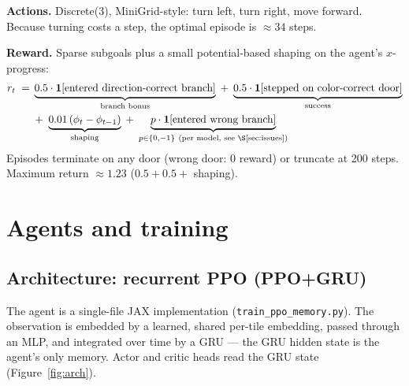 \documentclass[11pt]{article}
\begin{document}
\textbf{Actions.} Discrete(3), MiniGrid-style: turn left, turn right, move forward. Because
turning costs a step, the optimal episode is $\approx 34$ steps.

\textbf{Reward.} Sparse subgoals plus a small potential-based shaping on the agent's
$x$-progress:
\begin{align*}
r_t \;=\;& \underbrace{0.5\cdot\mathbf{1}[\text{entered direction-correct branch}]}_{\text{branch bonus}}
\;+\; \underbrace{0.5\cdot\mathbf{1}[\text{stepped on color-correct door}]}_{\text{success}} \\
&+\; \underbrace{0.01\,(\phi_t - \phi_{t-1})}_{\text{shaping}}
\;+\; \underbrace{p\cdot\mathbf{1}[\text{entered wrong branch}]}_{p \in \{0, -1\}\ \text{(per model, see \S\ref{sec:issues})}}
\end{align*}
Episodes terminate on any door (wrong door: 0 reward) or truncate at 200 steps. Maximum return
$\approx 1.23$ ($0.5 + 0.5 + $ shaping).

\section{Agents and training}

\subsection{Architecture: recurrent PPO (PPO+GRU)}

The agent is a single-file JAX implementation (\texttt{train\_ppo\_memory.py}). The observation is
embedded by a learned, shared per-tile embedding, passed through an MLP, and integrated over time
by a GRU --- the GRU hidden state is the agent's only memory. Actor and critic heads read the GRU
state (Figure~\ref{fig:arch}).
\end{document}
